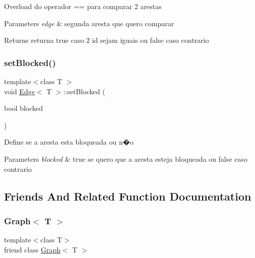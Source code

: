 Overload do operador == para comparar 2 arestas 
\begin{DoxyParams}{Parameters}
{\em edge} & segunda aresta que quero comparar \\
\hline
\end{DoxyParams}
\begin{DoxyReturn}{Returns}
returna true caso 2 id sejam iguais ou false caso contrario 
\end{DoxyReturn}
\mbox{\label{class_edge_ad16b09e81bcfeed46393c11eb4bb7681}} 
\subsubsection{\texorpdfstring{set\+Blocked()}{setBlocked()}}
{\footnotesize\ttfamily template$<$class T $>$ \\
void \mbox{\hyperlink{class_edge}{Edge}}$<$ T $>$\+::set\+Blocked (\begin{DoxyParamCaption}\item[{bool}]{blocked }\end{DoxyParamCaption})}

Define se a aresta esta bloqueada ou n�o 
\begin{DoxyParams}{Parameters}
{\em blocked} & true se quero que a aresta esteja bloqueada ou false caso contrario \\
\hline
\end{DoxyParams}


\subsection{Friends And Related Function Documentation}
\mbox{\label{class_edge_aefa9b76cd57411c5354e5620dc2d84dd}} 
\subsubsection{\texorpdfstring{Graph$<$ T $>$}{Graph< T >}}
{\footnotesize\ttfamily template$<$class T$>$ \\
friend class \mbox{\hyperlink{class_graph}{Graph}}$<$ T $>$\hspace{0.3cm}{\ttfamily [friend]}}

\mbox{\label{class_edge_a2e120a12dec663fa334633b4f26cbed8}} 
